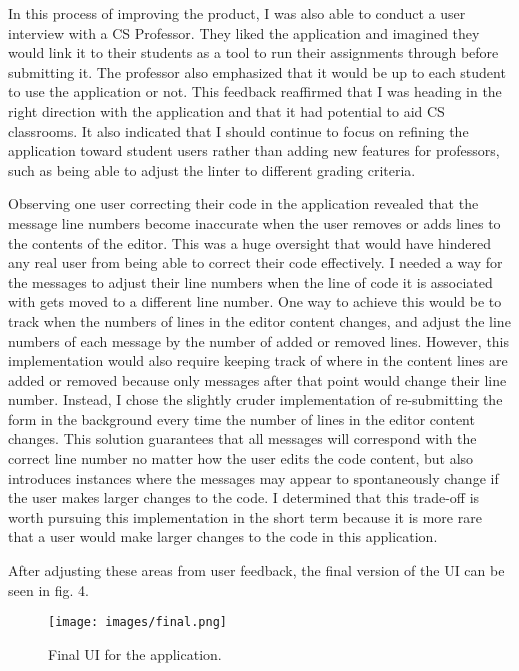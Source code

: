 \documentclass[10pt,twocolumn]{article}
\begin{document}
In this process of improving the product, I was also able to conduct a user interview with a CS Professor. 
They liked the application and imagined they would link it to their students as a tool to run their assignments through before submitting it. 
The professor also emphasized that it would be up to each student to use the application or not. 
This feedback reaffirmed that I was heading in the right direction with the application and that it had potential to aid CS classrooms. 
It also indicated that I should continue to focus on refining the application toward student users rather than adding new features for professors, such as being able to adjust the linter to different grading criteria.

Observing one user correcting their code in the application revealed that the message line numbers become inaccurate when the user removes or adds lines to the contents of the editor. 
This was a huge oversight that would have hindered any real user from being able to correct their code effectively. 
I needed a way for the messages to adjust their line numbers when the line of code it is associated with gets moved to a different line number. 
One way to achieve this would be to track when the numbers of lines in the editor content changes, and adjust the line numbers of each message by the number of added or removed lines. 
However, this implementation would also require keeping track of where in the content lines are added or removed because only messages after that point would change their line number. 
Instead, I chose the slightly cruder implementation of re-submitting the form in the background every time the number of lines in the editor content changes. 
This solution guarantees that all messages will correspond with the correct line number no matter how the user edits the code content, but also introduces instances where the messages may appear to spontaneously change if the user makes larger changes to the code. 
I determined that this trade-off is worth pursuing this implementation in the short term because it is more rare that a user would make larger changes to the code in this application. 

After adjusting these areas from user feedback, the final version of the UI can be seen in fig. 4.

\begin{figure}
\texttt{[image: images/final.png]}
\centering
\vspace{.5cm}
\caption{Final UI for the application.}
\end{figure}
\end{document}
